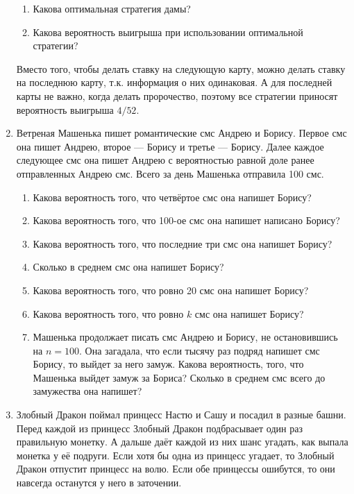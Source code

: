 \documentclass[nobib]{tufte-handout}
\begin{document}
\begin{enumerate}
\begin{enumerate}
\item Какова оптимальная стратегия дамы?
\item Какова вероятность выигрыша при использовании оптимальной стратегии?
\end{enumerate}

\begin{solution}
Вместо того, чтобы делать ставку на следующую карту, можно делать ставку на последнюю карту, т.к. информация о них одинаковая. А для последней карты не важно, когда делать пророчество, поэтому все стратегии приносят вероятность выигрыша $4/52$.
\end{solution}

\item Ветреная Машенька пишет романтические смс Андрею и Борису. Первое смс она пишет Андрею, второе --- Борису и третье --- Борису. Далее каждое следующее смс она пишет Андрею с вероятностью равной доле ранее отправленных Андрею смс. Всего за день Машенька отправила 100 смс.

\begin{enumerate}
\item Какова вероятность того, что четвёртое смс она напишет Борису?
\item Какова вероятность того, что 100-ое смс она напишет написано Борису?
\item Какова вероятность того, что последние три смс она напишет Борису?
\item Сколько в среднем смс она напишет Борису?
\item Какова вероятность того, что ровно 20 смс она напишет Борису?
\item Какова вероятность того, что ровно $k$ смс она напишет Борису?
\item Машенька продолжает писать смс Андрею и Борису, не остановившись на $n=100$. Она загадала, что если тысячу раз подряд напишет смс Борису, то выйдет за него замуж. Какова вероятность, того, что Машенька выйдет замуж за Бориса? Сколько в среднем смс всего до замужества она напишет?
\end{enumerate}

\begin{solution}


\end{solution}

\item Злобный Дракон поймал принцесс Настю и Сашу и посадил в разные башни. Перед каждой из принцесс Злобный Дракон подбрасывает один раз правильную монетку. А дальше даёт каждой из них шанс угадать, как выпала монетка у её подруги. Если хотя бы одна из принцесс угадает, то Злобный Дракон отпустит принцесс на волю. Если обе принцессы ошибутся, то они навсегда останутся у него в заточении.


\end{enumerate}
\end{document}
